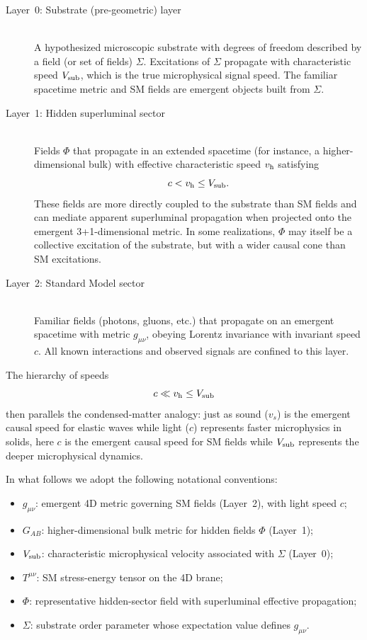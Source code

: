 \documentclass[aps,prd,twocolumn,nofootinbib,superscriptaddress]{revtex4-2}
\begin{document}
\begin{description}
    \item[Layer~0: Substrate (pre-geometric) layer] \hfill\\
    A hypothesized microscopic substrate with degrees of freedom described by a field (or set of fields) $\Sigma$. Excitations of $\Sigma$ propagate with characteristic speed $V_{\rm sub}$, which is the true microphysical signal speed. The familiar spacetime metric and SM fields are emergent objects built from $\Sigma$.

    \item[Layer~1: Hidden superluminal sector] \hfill\\
    Fields $\Phi$ that propagate in an extended spacetime (for instance, a higher-dimensional bulk) with effective characteristic speed $v_{\rm h}$ satisfying
    \begin{equation}
        c < v_{\rm h} \le V_{\rm sub}.
    \end{equation}
    These fields are more directly coupled to the substrate than SM fields and can mediate apparent superluminal propagation when projected onto the emergent 3+1-dimensional metric. In some realizations, $\Phi$ may itself be a collective excitation of the substrate, but with a wider causal cone than SM excitations.

    \item[Layer~2: Standard Model sector] \hfill\\
    Familiar fields (photons, gluons, etc.) that propagate on an emergent spacetime with metric $g_{\mu\nu}$, obeying Lorentz invariance with invariant speed $c$. All known interactions and observed signals are confined to this layer.
\end{description}

The hierarchy of speeds
\begin{equation}
    c \ll v_{\rm h} \le V_{\rm sub}
\end{equation}
then parallels the condensed-matter analogy: just as sound ($v_s$) is the emergent causal speed for elastic waves while light ($c$) represents faster microphysics in solids, here $c$ is the emergent causal speed for SM fields while $V_{\rm sub}$ represents the deeper microphysical dynamics.

In what follows we adopt the following notational conventions:
\begin{itemize}
    \item $g_{\mu\nu}$: emergent 4D metric governing SM fields (Layer~2), with light speed $c$;
    \item $G_{AB}$: higher-dimensional bulk metric for hidden fields $\Phi$ (Layer~1);
    \item $V_{\rm sub}$: characteristic microphysical velocity associated with $\Sigma$ (Layer~0);
    \item $T^{\mu\nu}$: SM stress-energy tensor on the 4D brane;
    \item $\Phi$: representative hidden-sector field with superluminal effective propagation;
    \item $\Sigma$: substrate order parameter whose expectation value defines $g_{\mu\nu}$.
\end{itemize}
\end{document}
